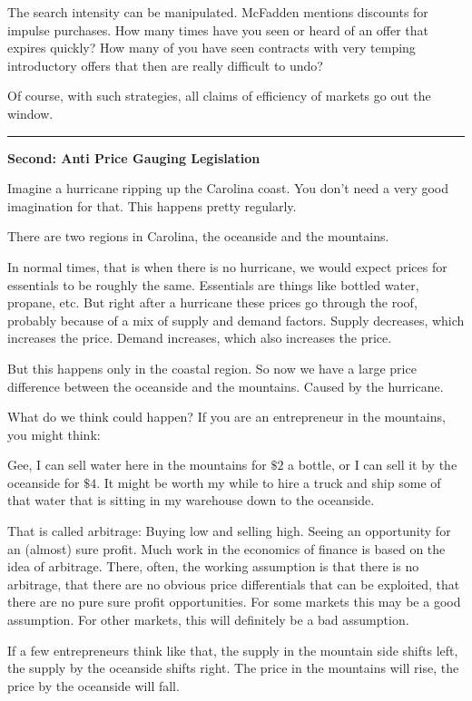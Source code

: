 \documentclass[
]{book}
\begin{document}
The search intensity can be manipulated. McFadden mentions discounts for impulse purchases. How many times have you seen or heard of an offer that expires quickly? How many of you have seen contracts with very temping introductory offers that then are really difficult to undo?

Of course, with such strategies, all claims of efficiency of markets go out the window.

\begin{center}\rule{0.5\linewidth}{0.5pt}\end{center}

\textbf{Second: Anti Price Gauging Legislation}

Imagine a hurricane ripping up the Carolina coast. You don't need a very good imagination for that. This happens pretty regularly.

There are two regions in Carolina, the oceanside and the mountains.

In normal times, that is when there is no hurricane, we would expect prices for essentials to be roughly the same. Essentials are things like bottled water, propane, etc. But right after a hurricane these prices go through the roof, probably because of a mix of supply and demand factors. Supply decreases, which increases the price. Demand increases, which also increases the price.

But this happens only in the coastal region. So now we have a large price difference between the oceanside and the mountains. Caused by the hurricane.

What do we think could happen? If you are an entrepreneur in the mountains, you might think:

Gee, I can sell water here in the mountains for \(\$2\) a bottle, or I can sell it by the oceanside for \(\$4\). It might be worth my while to hire a truck and ship some of that water that is sitting in my warehouse down to the oceanside.

That is called arbitrage: Buying low and selling high. Seeing an opportunity for an (almost) sure profit. Much work in the economics of finance is based on the idea of arbitrage. There, often, the working assumption is that there is no arbitrage, that there are no obvious price differentials that can be exploited, that there are no pure sure profit opportunities. For some markets this may be a good assumption. For other markets, this will definitely be a bad assumption.

If a few entrepreneurs think like that, the supply in the mountain side shifts left, the supply by the oceanside shifts right. The price in the mountains will rise, the price by the oceanside will fall.
\end{document}
